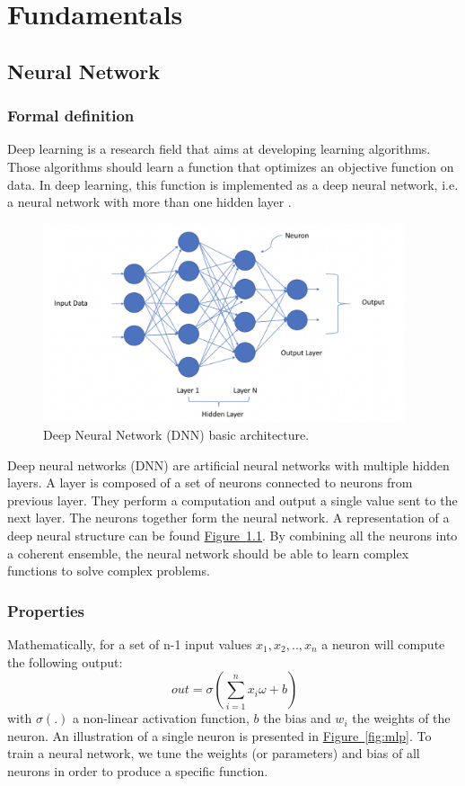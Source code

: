 \documentclass[english, LaM, oneside]{sapthesis}%
\begin{document}
\part{Fundamentals}

\chapter{Neural Network}
\label{nn}
\section{Formal definition}
Deep learning is a research field that aims at developing learning algorithms. Those algorithms should learn a function that optimizes an objective function on data. In deep learning, this function is implemented as a deep neural network, i.e. a neural network with more than one hidden layer \cite{neural-network}.
\begin{figure}[!h]
            \centering
            \includegraphics[width=0.95\textwidth]{DNN.png}
            \caption{Deep Neural Network (DNN) basic architecture.}
            \label{fig:dnn}
        \end{figure}
        
Deep neural networks (DNN) are artificial neural networks with multiple hidden layers. A layer is composed of a set of neurons connected to neurons from previous layer. They perform a computation and output a single value sent to the next layer. The neurons together form the neural network. A representation of a deep neural structure can be found \hyperref[fig:dnn]{Figure~\ref*{fig:dnn}}. By combining all the neurons into a coherent ensemble, the neural network should be able to learn complex functions to solve complex problems.

\section{Properties}
Mathematically, for a set of n-1 input values $x_1, x_2, .., x_n$ a neuron will compute the following output:
\[\ out = \sigma( \sum_{i=1}^{n}{x_i \omega+ b })\]
with $\sigma(.)$ a non-linear activation function, $b$ the bias and $w_i$ the weights of the neuron. An illustration of a single neuron is presented in \hyperref[fig:mlp]{Figure~\ref*{fig:mlp}}. To train a neural network, we tune the weights (or parameters) and bias of all neurons in order to produce a specific function.
\end{document}
